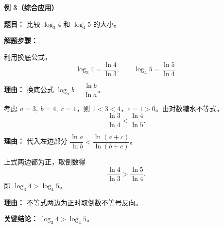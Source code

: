 \begin{examplebox}
	\textbf{\textcolor{CExample}{例 3（综合应用）}}

	\textbf{\textcolor{CExample}{题目：}}
	比较 $\log_3 4$ 和 $\log_4 5$ 的大小。

	\textbf{\textcolor{CExample}{解题步骤：}}
	\begin{description}[style=nextline, leftmargin=2.8em, labelsep=0.5em, itemsep=0.45em]
		\item[\textbf{第一步（化同底）：}] 利用换底公式，
			\[
				\log_3 4 = \frac{\ln 4}{\ln 3},
				\qquad
				\log_4 5 = \frac{\ln 5}{\ln 4}.
			\]
			\par\textbf{理由：} 换底公式 $\log_a b = \dfrac{\ln b}{\ln a}$。

		\item[\textbf{第二步（构造糖水不等式）：}] 考虑 $a=3,\;b=4,\;c=1$，则 $1<3<4$，$c=1>0$。由对数糖水不等式，
			\[
				\frac{\ln 3}{\ln 4} < \frac{\ln 4}{\ln 5}.
			\]
			\par\textbf{理由：} 代入左边部分 $\dfrac{\ln a}{\ln b}<\dfrac{\ln(a+c)}{\ln(b+c)}$。

		\item[\textbf{第三步（取倒数变形）：}] 上式两边都为正，取倒数得
			\[
				\frac{\ln 4}{\ln 3} > \frac{\ln 5}{\ln 4}.
			\]
			即 $\log_3 4 > \log_4 5$。
			\par\textbf{理由：} 不等式两边为正时取倒数不等号反向。
	\end{description}

	\textbf{\textcolor{CExample}{关键结论：}}
	$\boxed{\log_3 4 > \log_4 5}$。
\end{examplebox}
